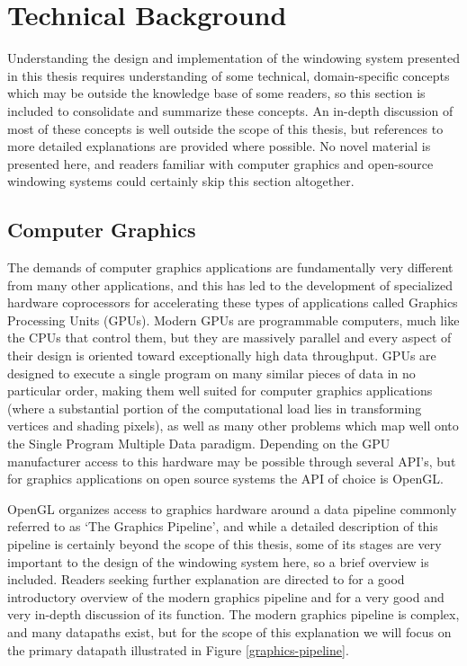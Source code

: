 \chapter{Technical Background}
Understanding the design and implementation of the windowing system presented in this thesis requires understanding of some technical, domain-specific concepts which may be outside the knowledge base of some readers, so this section is included to consolidate and summarize these concepts. An in-depth discussion of most of these concepts is well outside the scope of this thesis, but references to more detailed explanations are provided where possible. No novel material is presented here, and readers familiar with computer graphics and open-source windowing systems could certainly skip this section altogether.

\section{Computer Graphics}
The demands of computer graphics applications are fundamentally very different from many other applications, and this has led to the development of specialized hardware coprocessors for accelerating these types of applications called Graphics Processing Units (GPUs). Modern GPUs are programmable computers, much like the CPUs that control them, but they are massively parallel and every aspect of their design is oriented toward exceptionally high data throughput. GPUs are designed to execute a single program on many similar pieces of data in no particular order, making them well suited for computer graphics applications (where a substantial portion of the computational load lies in transforming vertices and shading pixels), as well as many other problems which map well onto the Single Program Multiple Data paradigm. Depending on the GPU manufacturer access to this hardware may be possible through several API’s, but for graphics applications on open source systems the API of choice is OpenGL.
		
OpenGL organizes access to graphics hardware around a data pipeline commonly referred to as ‘The Graphics Pipeline’, and while a detailed description of this pipeline is certainly beyond the scope of this thesis, some of its stages are very important to the design of the windowing system here, so a brief overview is included. Readers seeking further explanation are directed to \cite{graphics-intro} for a good introductory overview of the modern graphics pipeline and \cite{trip-through-pipeline} for a very good and very in-depth discussion of its function. The modern graphics pipeline is complex, and many datapaths exist, but for the scope of this explanation we will focus on the primary datapath illustrated in Figure \ref{graphics-pipeline}.

